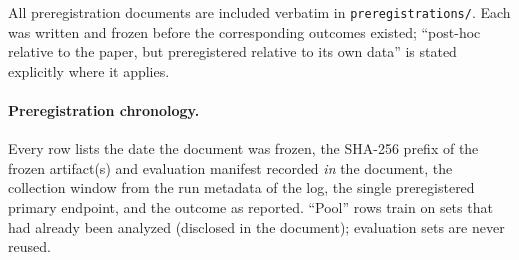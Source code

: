\documentclass[10pt]{article}
\begin{document}
All preregistration documents are included verbatim in
\texttt{preregistrations/}. Each was written and frozen before the
corresponding outcomes existed; ``post-hoc relative to the paper, but
preregistered relative to its own data'' is stated explicitly where it
applies.

\paragraph{Preregistration chronology.}
Every row lists the date the document was frozen, the SHA-256 prefix of the
frozen artifact(s) and evaluation manifest recorded \emph{in} the document,
the collection window from the run metadata of the log, the single
preregistered primary endpoint, and the outcome as reported. ``Pool'' rows
train on sets that had already been analyzed (disclosed in the document);
evaluation sets are never reused.
\end{document}
